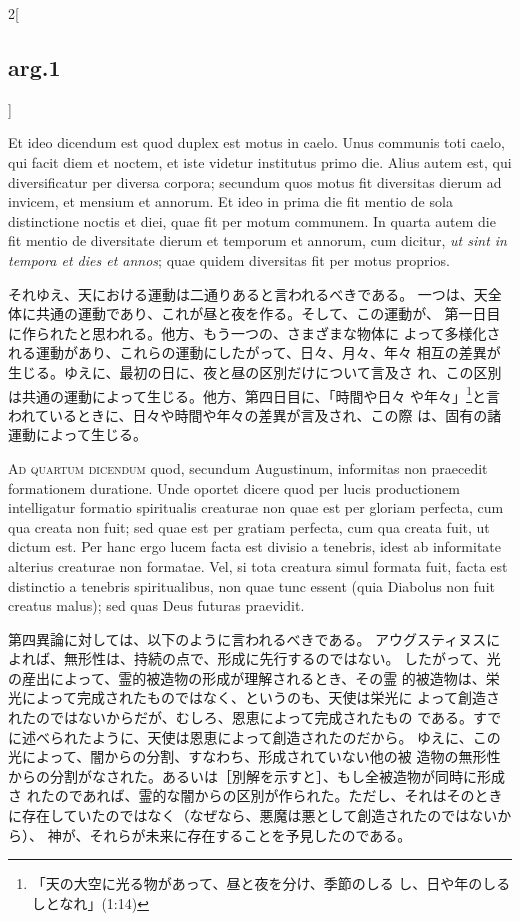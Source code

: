 \documentclass[paper=a4paper,fontsize=10pt,jafontsize=9pt,titlepage]{jlreq}
\begin{document}
\begin{paracol}{2}[\subsection{arg.1}]
\switchcolumn*

Et ideo dicendum est quod duplex est motus in caelo. Unus
communis toti caelo, qui facit diem et noctem, et iste videtur
institutus primo die. Alius autem est, qui diversificatur per diversa
corpora; secundum quos motus fit diversitas dierum ad invicem, et
mensium et annorum. Et ideo in prima die fit mentio de sola distinctione
noctis et diei, quae fit per motum communem. In quarta autem die fit
mentio de diversitate dierum et temporum et annorum, cum dicitur, {\itshape ut
sint in tempora et dies et annos}; quae quidem diversitas fit per motus
proprios.

\switchcolumn

それゆえ、天における運動は二通りあると言われるべきである。
一つは、天全体に共通の運動であり、これが昼と夜を作る。そして、この運動が、
 第一日目に作られたと思われる。他方、もう一つの、さまざまな物体に
 よって多様化される運動があり、これらの運動にしたがって、日々、月々、年々
 相互の差異が生じる。ゆえに、最初の日に、夜と昼の区別だけについて言及さ
 れ、この区別は共通の運動によって生じる。他方、第四日目に、「時間や日々
 や年々」\footnote{「天の大空に光る物があって、昼と夜を分け、季節のしる
 し、日や年のしるしとなれ」(1:14)}と言われているときに、日々や時間や年々の差異が言及され、この際
 は、固有の諸運動によって生じる。

\switchcolumn*[\subsection{ad.4}]

{\scshape Ad quartum dicendum} quod, secundum
Augustinum, informitas non praecedit formationem duratione. Unde oportet
dicere quod per lucis productionem intelligatur formatio spiritualis
creaturae non quae est per gloriam perfecta, cum qua creata non fuit;
sed quae est per gratiam perfecta, cum qua creata fuit, ut dictum
est. Per hanc ergo lucem facta est divisio a tenebris, idest ab
informitate alterius creaturae non formatae. Vel, si tota creatura simul
formata fuit, facta est distinctio a tenebris spiritualibus, non quae
tunc essent (quia Diabolus non fuit creatus malus); sed quas Deus
futuras praevidit.

\switchcolumn

第四異論に対しては、以下のように言われるべきである。
アウグスティヌスによれば、無形性は、持続の点で、形成に先行するのではない。
 したがって、光の産出によって、霊的被造物の形成が理解されるとき、その霊
 的被造物は、栄光によって完成されたものではなく、というのも、天使は栄光に
 よって創造されたのではないからだが、むしろ、恩恵によって完成されたもの
 である。すでに述べられたように、天使は恩恵によって創造されたのだから。
 ゆえに、この光によって、闇からの分割、すなわち、形成されていない他の被
 造物の無形性からの分割がなされた。あるいは［別解を示すと］、もし全被造物が同時に形成さ
 れたのであれば、霊的な闇からの区別が作られた。ただし、それはそのとき
 に存在していたのではなく（なぜなら、悪魔は悪として創造されたのではないから）、
 神が、それらが未来に存在することを予見したのである。

\end{paracol}
\end{document}
